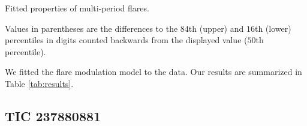 \documentclass[fleqn,usenatbib,letters]{mnras}%
\newcommand{\FC}{TIC 237880881} %
\begin{document}
\begin{table}
\centering
\caption{Fitted properties of multi-period flares.}
\label{tab:results}

Values in parentheses are the differences to the $84$th (upper) and $16$th (lower) percentiles in digits counted backwards from the displayed value ($50$th percentile).
\end{table}
We fitted the flare modulation model to the data. Our results are summarized in Table \ref{tab:results}.
\subsection{\FC}
\end{document}
